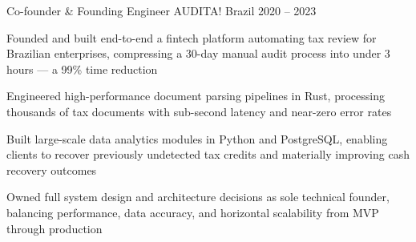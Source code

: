 \begin{cventries}
	\cventry
	{Co-founder \& Founding Engineer}
	{AUDITA!}
	{Brazil}
	{2020 -- 2023}
	{
		\begin{cvitems}
			\item Founded and built end-to-end a fintech platform automating tax review for Brazilian enterprises, compressing a 30-day manual audit process into under 3 hours — a 99\% time reduction
			\item Engineered high-performance document parsing pipelines in Rust, processing thousands of tax documents with sub-second latency and near-zero error rates
			\item Built large-scale data analytics modules in Python and PostgreSQL, enabling clients to recover previously undetected tax credits and materially improving cash recovery outcomes
			\item Owned full system design and architecture decisions as sole technical founder, balancing performance, data accuracy, and horizontal scalability from MVP through production
		\end{cvitems}
	}

\end{cventries}
